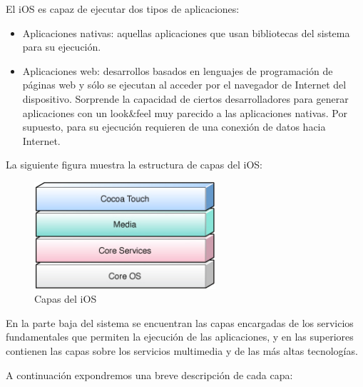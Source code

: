  El iOS es capaz de ejecutar dos tipos de aplicaciones: 
\begin{itemize}
\item Aplicaciones nativas: 
aquellas aplicaciones que usan bibliotecas del sistema para su ejecución. 
\item Aplicaciones web: desarrollos basados %
en lenguajes de programación de páginas web y sólo se ejecutan al acceder por el navegador de Internet del dispositivo. Sorprende la capacidad de ciertos desarrolladores para generar aplicaciones con un look\&feel muy parecido a las aplicaciones nativas. Por supuesto, para su ejecución requieren de una conexión de datos hacia Internet.
 \end{itemize}


\noindent
La siguiente figura muestra la estructura de capas del iOS:


\begin{figure} [h]
  \centering
    \includegraphics[width=0.6\textwidth]{./images/overview_systemlayers.jpg}
  \caption{Capas del iOS}
  \label{fig:Capas-del-iOS}
\end{figure}

En la parte baja del sistema se encuentran las capas encargadas de los
servicios fundamentales que permiten la ejecución de las aplicaciones,
y en las superiores contienen las capas sobre los servicios multimedia
y de las más altas tecnologías.
 

A continuación expondremos una breve descripción de cada capa:

